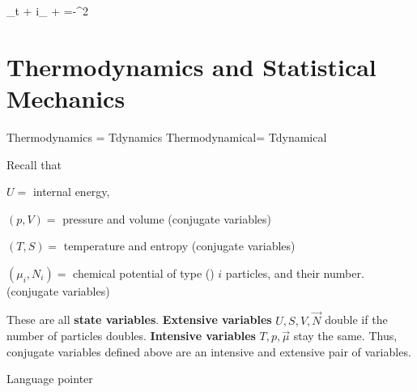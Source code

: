 \beq
\boxed
{\partial_t
\pform{\beta}{}
+
i_\vecv {}
+
=-\nu \nabla^2 \pform{\beta}{}}
\eeq

\section{Thermodynamics and Statistical Mechanics}
\label{sec-thermo-stat-differ-geo}

Thermodynamics = Tdynamics
Thermodynamical= Tdynamical

Recall that

$U=$ internal energy, 

$(p, V)=$ pressure and volume (conjugate variables)

 $(T, S)=$ temperature and entropy (conjugate variables)

 $(\mu_i, N_i)=$ chemical potential of type () $i$ particles,
and their number. (conjugate variables)


These are all {\bf state variables}. {\bf Extensive variables}  $U, S, V, \vec{N}$  double if
the number of particles doubles.
{\bf Intensive variables}  $T, p, \vec{\mu}$ stay the same.
Thus, conjugate variables defined above are an intensive and extensive pair of variables.

Language pointer

